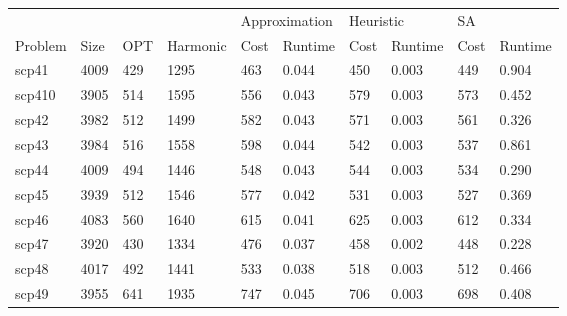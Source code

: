 \begin{table}[h]
\centering
\begin{tabular}{@{}llllllllll@{}}
\toprule
        &      &     &          & \multicolumn{2}{l}{Approximation} & \multicolumn{2}{l}{Heuristic} & \multicolumn{2}{l}{SA} \\
Problem & Size & OPT & Harmonic & Cost           & Runtime          & Cost         & Runtime        & Cost     & Runtime     \\ \midrule
scp41   & 4009 & 429 & 1295     & 463            & 0.044            & 450          & 0.003          & 449      & 0.904       \\
scp410  & 3905 & 514 & 1595     & 556            & 0.043            & 579          & 0.003          & 573      & 0.452       \\
scp42   & 3982 & 512 & 1499     & 582            & 0.043            & 571          & 0.003          & 561      & 0.326       \\
scp43   & 3984 & 516 & 1558     & 598            & 0.044            & 542          & 0.003          & 537      & 0.861       \\
scp44   & 4009 & 494 & 1446     & 548            & 0.043            & 544          & 0.003          & 534      & 0.290       \\
scp45   & 3939 & 512 & 1546     & 577            & 0.042            & 531          & 0.003          & 527      & 0.369       \\
scp46   & 4083 & 560 & 1640     & 615            & 0.041            & 625          & 0.003          & 612      & 0.334       \\
scp47   & 3920 & 430 & 1334     & 476            & 0.037            & 458          & 0.002          & 448      & 0.228       \\
scp48   & 4017 & 492 & 1441     & 533            & 0.038            & 518          & 0.003          & 512      & 0.466       \\
scp49   & 3955 & 641 & 1935     & 747            & 0.045            & 706          & 0.003          & 698      & 0.408       \\ \bottomrule
\end{tabular}
\end{table}

